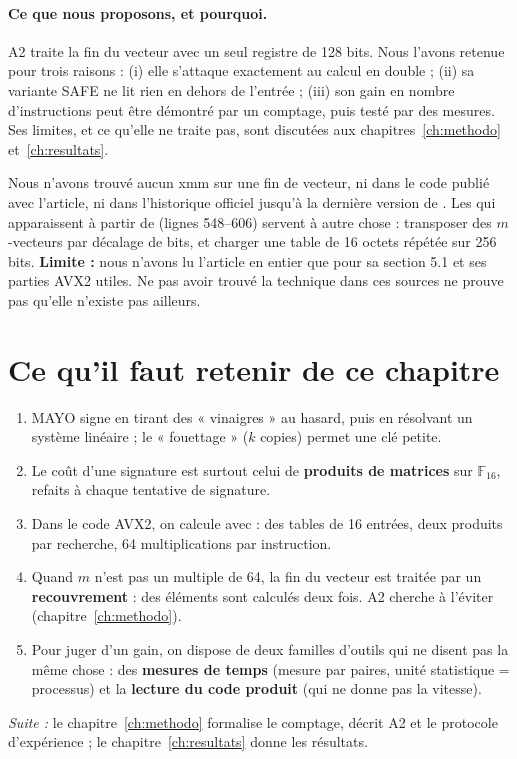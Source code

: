 \paragraph{Ce que nous proposons, et pourquoi.} A2 traite la fin du vecteur avec un seul registre de 128 bits. Nous l'avons retenue pour trois raisons : (i) elle s'attaque exactement au calcul en double ; (ii) sa variante SAFE ne lit rien en dehors de l'entrée ; (iii) son gain en nombre d'instructions peut être démontré par un comptage, puis testé par des mesures. Ses limites, et ce qu'elle ne traite pas, sont discutées aux chapitres~\ref{ch:methodo} et~\ref{ch:resultats}.

Nous n'avons trouvé aucun  xmm sur une fin de vecteur, ni dans le code publié avec l'article, ni dans l'historique officiel jusqu'à la dernière version de . Les  qui apparaissent à partir de  (lignes 548--606) servent à autre chose : transposer des $m$-vecteurs par décalage de bits, et charger une table de 16 octets répétée sur 256 bits. \textbf{Limite :} nous n'avons lu l'article en entier que pour sa section 5.1 et ses parties AVX2 utiles. Ne pas avoir trouvé la technique dans ces sources ne prouve pas qu'elle n'existe pas ailleurs.

\section*{Ce qu'il faut retenir de ce chapitre}
\begin{enumerate}[itemsep=2pt]
\item MAYO signe en tirant des « vinaigres » au hasard, puis en résolvant un système linéaire ; le « fouettage » ($k$ copies) permet une clé petite.
\item Le coût d'une signature est surtout celui de \textbf{produits de matrices} sur $\mathbb{F}_{16}$, refaits à chaque tentative de signature.
\item Dans le code AVX2, on calcule avec \vpshufb{} : des tables de 16 entrées, deux produits par recherche, 64 multiplications par instruction.
\item Quand $m$ n'est pas un multiple de 64, la fin du vecteur est traitée par un \textbf{recouvrement} : des éléments sont calculés deux fois. A2 cherche à l'éviter (chapitre~\ref{ch:methodo}).
\item Pour juger d'un gain, on dispose de deux familles d'outils qui ne disent pas la même chose : des \textbf{mesures de temps} (mesure par paires, unité statistique = processus) et la \textbf{lecture du code produit} (qui ne donne pas la vitesse).
\end{enumerate}
\emph{Suite :} le chapitre~\ref{ch:methodo} formalise le comptage, décrit A2 et le protocole d'expérience ; le chapitre~\ref{ch:resultats} donne les résultats.
